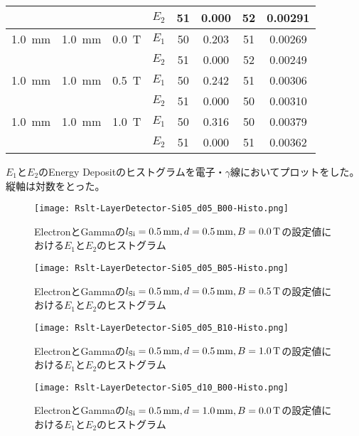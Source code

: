 \documentclass[a4paper,10pt]{jreport}
\begin{document}
\begin{table}[H]
\begin{tabular}{ccc|c|cc|cc}
		  &  &  & $E_2$ & 51 & 0.000 & 52 & 0.00291 \\
		\hline
		\SI{1.0}{mm} & \SI{1.0}{mm} & \SI{0.0}{T} & $E_1$ & 50 & 0.203 & 51 & 0.00269 \\
		  &  &  & $E_2$ & 51 & 0.000 & 52 & 0.00249 \\
		\hline
		\SI{1.0}{mm} & \SI{1.0}{mm} & \SI{0.5}{T} & $E_1$ & 50 & 0.242 & 51 & 0.00306 \\
		  &  &  & $E_2$ & 51 & 0.000 & 50 & 0.00310 \\
		\hline
		\SI{1.0}{mm} & \SI{1.0}{mm} & \SI{1.0}{T} & $E_1$ & 50 & 0.316 & 50 & 0.00379 \\
		  &  &  & $E_2$ & 51 & 0.000 & 51 & 0.00362 \\
		\hline
	\end{tabular}
\end{table}

$E_1$と$E_2$のEnergy Depositのヒストグラムを電子・$\gamma$線においてプロットをした。
縦軸は対数をとった。

\begin{figure}[H]
	\center
	\texttt{[image: Rslt-LayerDetector-Si05\_d05\_B00-Histo.png]}
	\caption{ElectronとGammaの$l_{\rm{Si}}=\SI{0.5}{mm}, d=\SI{0.5}{mm}, B=\SI{0.0}{T}$の設定値における$E_1$と$E_2$のヒストグラム}
	\label{Rslt-LayerDetector-Si05_d05_B00-Histo}
\end{figure}

\begin{figure}[H]
	\center
	\texttt{[image: Rslt-LayerDetector-Si05\_d05\_B05-Histo.png]}
	\caption{ElectronとGammaの$l_{\rm{Si}}=\SI{0.5}{mm}, d=\SI{0.5}{mm}, B=\SI{0.5}{T}$の設定値における$E_1$と$E_2$のヒストグラム}
	\label{Rslt-LayerDetector-Si05_d05_B05-Histo}
\end{figure}

\begin{figure}[H]
	\center
	\texttt{[image: Rslt-LayerDetector-Si05\_d05\_B10-Histo.png]}
	\caption{ElectronとGammaの$l_{\rm{Si}}=\SI{0.5}{mm}, d=\SI{0.5}{mm}, B=\SI{1.0}{T}$の設定値における$E_1$と$E_2$のヒストグラム}
	\label{Rslt-LayerDetector-Si05_d05_B10-Histo}
\end{figure}

\begin{figure}[H]
	\center
	\texttt{[image: Rslt-LayerDetector-Si05\_d10\_B00-Histo.png]}
	\caption{ElectronとGammaの$l_{\rm{Si}}=\SI{0.5}{mm}, d=\SI{1.0}{mm}, B=\SI{0.0}{T}$の設定値における$E_1$と$E_2$のヒストグラム}
	\label{Rslt-LayerDetector-Si05_d10_B00-Histo}
\end{figure}
\end{document}
